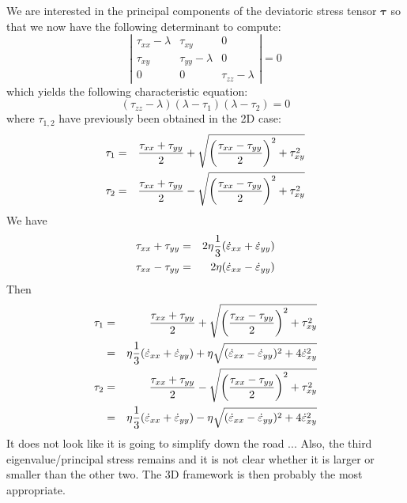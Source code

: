 We are interested in the principal components
of the deviatoric stress tensor $\bm \tau$ so that we now have the following determinant to compute:
\[
\left|  
\begin{array}{ccc}
\tau_{xx}-\lambda & \tau_{xy} & 0 \\
\tau_{xy} & \tau_{yy}-\lambda & 0 \\
0 &0 & \tau_{zz} -\lambda
\end{array}
\right|
=0
\]
which yields the following characteristic equation:
\[
(\tau_{zz} -\lambda)(\lambda-\tau_1)(\lambda-\tau_2) =0
\]
where $\tau_{1,2}$ have previously been obtained in the 2D case:
\begin{eqnarray}
\tau_1 
&=& \frac{ \tau_{xx}+\tau_{yy}}{2} 
+ \sqrt{ \left(\frac{\tau_{xx}-\tau_{yy}}{2}\right)^2 +\tau_{xy}^2 } 
\nonumber\\
\tau_2 &=& \frac{ \tau_{xx}+\tau_{yy}}{2} 
- \sqrt{ \left(\frac{\tau_{xx}-\tau_{yy}}{2}\right)^2 +\tau_{xy}^2 } 
\end{eqnarray}
We have 
\begin{eqnarray}
\tau_{xx}+\tau_{yy} &=& 2\eta \frac13 (\dot{\varepsilon}_{xx} + \dot{\varepsilon}_{yy}) \nonumber\\
\tau_{xx}-\tau_{yy} &=& 2\eta (\dot{\varepsilon}_{xx} - \dot{\varepsilon}_{yy})
\end{eqnarray}
Then 
\begin{eqnarray}
\tau_1 
&=& \frac{ \tau_{xx}+\tau_{yy}}{2} 
+ \sqrt{ \left(\frac{\tau_{xx}-\tau_{yy}}{2}\right)^2 +\tau_{xy}^2 } 
\nonumber\\
&=& \eta \frac13 (\dot{\varepsilon}_{xx} + \dot{\varepsilon}_{yy})
+ \eta \sqrt{ (\dot{\varepsilon}_{xx} - \dot{\varepsilon}_{yy})^2 +4  \dot{\varepsilon}_{xy}^2  } 
\nonumber\\
\tau_2 
&=& \frac{ \tau_{xx}+\tau_{yy}}{2} 
- \sqrt{ \left(\frac{\tau_{xx}-\tau_{yy}}{2}\right)^2 +\tau_{xy}^2 } \nonumber\\
&=& \eta \frac13 (\dot{\varepsilon}_{xx} + \dot{\varepsilon}_{yy})
- \eta \sqrt{ (\dot{\varepsilon}_{xx} - \dot{\varepsilon}_{yy})^2 +4  \dot{\varepsilon}_{xy}^2  } 
\end{eqnarray}
It does not look like it is going to simplify down the road ... Also, 
the third eigenvalue/principal stress remains and it is not clear whether it is 
larger or smaller than the other two.
The 3D framework is then probably the most appropriate.











